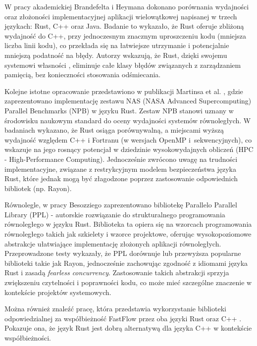 W pracy akademickiej Brandefelta i Heymana \cite{heyman2020comparison} dokonano porównania wydajności oraz złożoności implementacyjnej aplikacji wielowątkowej napisanej w trzech językach: Rust, C++ oraz Java. Badanie to wykazało, że Rust oferuje zbliżoną wydajność do C++, przy jednoczesnym znacznym uproszczeniu kodu (mniejsza liczba linii kodu), co przekłada się na łatwiejsze utrzymanie i potencjalnie mniejszą podatność na błędy. Autorzy wskazują, że Rust, dzięki swojemu systemowi własności , eliminuje całe klasy błędów związanych z zarządzaniem pamięcią, bez konieczności stosowania odśmiecania.

Kolejne istotne opracowanie przedstawiono w publikacji Martinsa et al. \cite{martins2025npbrustnasparallelbenchmarks}, gdzie zaprezentowano implementację zestawu NAS (NASA Advanced Supercomputing) Parallel Benchmarks (NPB) \cite{nasaParallelBenchmarks} w języku Rust. Zestaw NPB stanowi uznany w środowisku naukowym standard do oceny wydajności systemów równoległych. W badaniach wykazano, że Rust osiąga porównywalną, a miejscami wyższą wydajność względem C++ i Fortranu (w wersjach OpenMP i~sekwencyjnych), co wskazuje na jego rosnący potencjał w dziedzinie wysokowydajnych obliczeń (HPC - High-Performance Computing). Jednocześnie zwrócono uwagę na trudności implementacyjne, związane z restrykcyjnym modelem bezpieczeństwa języka Rust, które jednak mogą być złagodzone poprzez zastosowanie odpowiednich bibliotek (np. Rayon).

Równolegle, w pracy Besozziego \cite{Besozzi} zaprezentowano bibliotekę Parallelo Parallel Library (PPL) - autorskie rozwiązanie do strukturalnego programowania równoległego w języku Rust. Biblioteka ta opiera się na wzorcach programowania równoległego takich jak szkielety  i wzorce projektowe, oferując wysokopoziomowe abstrakcje ułatwiające implementację złożonych aplikacji równoległych. Przeprowadzone testy wykazały, że PPL dorównuje lub przewyższa popularne biblioteki takie jak Rayon, jednocześnie zachowując zgodność z idiomami języka Rust i zasadą \textit{fearless concurrency}. Zastosowanie takich abstrakcji sprzyja zwiększeniu czytelności i poprawności kodu, co może mieć szczególne znaczenie w kontekście projektów systemowych.

Można również znaleźć pracę, która przedstawia wykorzystanie biblioteki odpowiedzialnej za współbieżność FastFlow przez oba języki Rust oraz C++ \cite{FastFlow}. Pokazuje ona, że język Rust jest dobrą alternatywą dla języka C++ w kontekście współbieżności.

